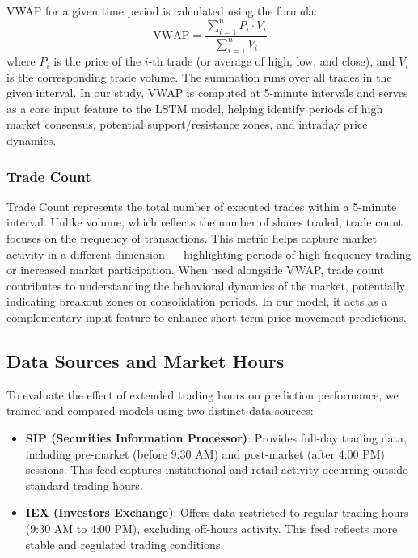 \documentclass[10pt,a4paper]{article}
\begin{document}
VWAP for a given time period is calculated using the formula:
\begin{equation}
\text{VWAP} = \frac{\sum_{i=1}^{n} P_i \cdot V_i}{\sum_{i=1}^{n} V_i}
\end{equation}
where $P_i$ is the price of the $i$-th trade (or average of high, low, and close), and $V_i$ is the corresponding trade volume. The summation runs over all trades in the given interval. In our study, VWAP is computed at 5-minute intervals and serves as a core input feature to the LSTM model, helping identify periods of high market consensus, potential support/resistance zones, and intraday price dynamics.

\subsubsection{Trade Count}

Trade Count represents the total number of executed trades within a 5-minute interval. Unlike volume, which reflects the number of shares traded, trade count focuses on the frequency of transactions. This metric helps capture market activity in a different dimension — highlighting periods of high-frequency trading or increased market participation. When used alongside VWAP, trade count contributes to understanding the behavioral dynamics of the market, potentially indicating breakout zones or consolidation periods. In our model, it acts as a complementary input feature to enhance short-term price movement predictions.

\subsection{Data Sources and Market Hours}

To evaluate the effect of extended trading hours on prediction performance, we trained and compared models using two distinct data sources:

\begin{itemize}
    \item \textbf{SIP (Securities Information Processor)}: Provides full-day trading data, including pre-market (before 9:30 AM) and post-market (after 4:00 PM) sessions. This feed captures institutional and retail activity occurring outside standard trading hours.
    
    \item \textbf{IEX (Investors Exchange)}: Offers data restricted to regular trading hours (9:30 AM to 4:00 PM), excluding off-hours activity. This feed reflects more stable and regulated trading conditions.
\end{itemize}
\end{document}
